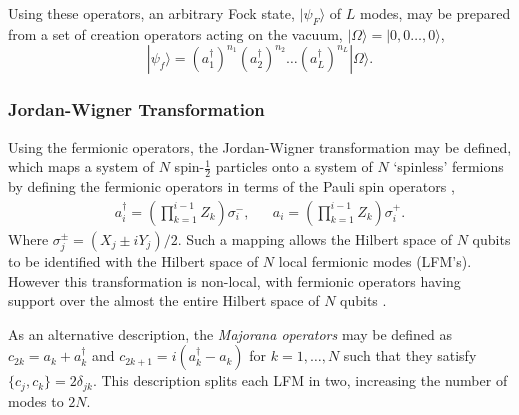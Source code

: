 Using these operators, an arbitrary Fock state, $|\psi_{F}\rangle$ of $L$ modes, may be prepared from a set of creation operators acting on the vacuum, $|\Omega\rangle = |0, 0 \dots, 0\rangle$, 
\begin{equation}
    |\psi_{f}\rangle = (a_{1}^{\dagger})^{n_1} (a_{2}^{\dagger})^{n_2} \dots (a_{L}^{\dagger})^{n_{L}}|{\Omega}\rangle.
\end{equation}

\subsubsection{Jordan-Wigner Transformation}

Using the fermionic operators, the Jordan-Wigner transformation may be defined, which maps a system of $N$ spin-$\frac{1}{2}$ particles onto a system of $N$ `spinless' fermions by defining the fermionic operators in terms of the Pauli spin operators \cite{landahl2023logical}, 
\begin{align}
    a^{\dagger}_i = \left(\prod^{i-1}_{k = 1} Z_k\right) \sigma^{-}_{i}, &&
    a_i = \left(\prod^{i-1}_{k = 1} Z_k\right) \sigma^{+}_{i}.
\end{align}
Where $\sigma^{\pm}_{j} = (X_j \pm i Y_j)/2$.
Such a mapping allows the Hilbert space of $N$ qubits to be identified with the Hilbert space of $N$ local fermionic modes (LFM's). However this transformation is non-local, with fermionic operators having support over the almost the entire Hilbert space of $N$ qubits \cite{ Ba_uls_2007}. 


As an alternative description, the \textit{Majorana operators} may be defined as 
$c_{2k} = a_k + a_k^{\dagger}$ and $c_{2k+1} = i(a_k^{\dagger} - a_{k})$ for $k =  1, \dots, N$ such that they satisfy $\{c_j, c_k\} = 2\delta_{jk}$. This description splits each LFM in two, increasing the number of modes to $2N$. 




